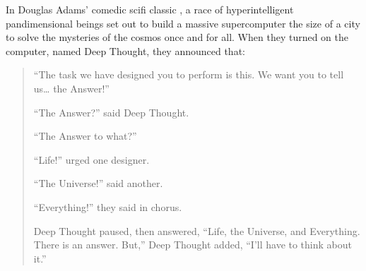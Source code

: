 \documentclass[letterpaper,10pt,english]{jupyterBook}
\begin{document}
\sphinxAtStartPar
In Douglas Adams’ comedic sci\sphinxhyphen{}fi classic , a race of hyperintelligent pandimensional beings set out to build a massive supercomputer the size of a city to solve the mysteries of the cosmos once and for all. When they turned on the computer, named Deep Thought, they announced that:
\begin{quote}

\sphinxAtStartPar
“The task we have designed you to perform is this. We want you to tell us… the Answer!”

\sphinxAtStartPar
“The Answer?” said Deep Thought.

\sphinxAtStartPar
“The Answer to what?”

\sphinxAtStartPar
“Life!” urged one designer.

\sphinxAtStartPar
“The Universe!” said another.

\sphinxAtStartPar
“Everything!” they said in chorus.

\sphinxAtStartPar
Deep Thought paused, then answered, “Life, the Universe, and Everything. There is an answer. But,” Deep Thought added, “I’ll have to think about it.”
\end{quote}
\end{document}
